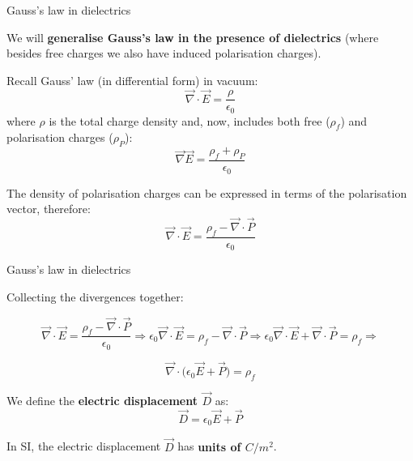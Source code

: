 %
%
%

\begin{frame}{Gauss's law in dielectrics}

We will {\bf generalise Gauss's law in the presence of dielectrics}
(where besides free charges we also have induced polarisation charges).\\

\vspace{0.2cm}

Recall Gauss' law (in differential form) in vacuum:
\begin{equation*}
   \vec{\nabla} \cdot \vec{E} = \frac{\rho}{\epsilon_0}
\end{equation*}
where $\rho$ is the total charge density and, now, includes both free ($\rho_f$) and polarisation charges ($\rho_P$):
\begin{equation*}
   \vec{\nabla} \vec{E} = \frac{\rho_f + \rho_P}{\epsilon_0}
\end{equation*}

The density of polarisation charges can be expressed in terms of the polarisation vector, therefore:
\begin{equation*}
   \vec{\nabla} \cdot \vec{E} = \frac{\rho_f - \vec{\nabla} \cdot \vec{P}}{\epsilon_0}
\end{equation*}

\end{frame}

%
%
%

\begin{frame}{Gauss's law in dielectrics}


Collecting the divergences together:

\begin{equation*}
   \vec{\nabla} \cdot \vec{E} = \frac{\rho_f - \vec{\nabla} \cdot \vec{P}}{\epsilon_0} \Rightarrow
   \epsilon_0 \vec{\nabla} \cdot \vec{E} = \rho_f - \vec{\nabla} \cdot \vec{P} \Rightarrow
   \epsilon_0 \vec{\nabla} \cdot \vec{E} + \vec{\nabla} \cdot \vec{P} = \rho_f \Rightarrow
\end{equation*}

\begin{equation*}
   \vec{\nabla} \cdot \Big( \epsilon_0 \vec{E} + \vec{P} \Big) = \rho_f
\end{equation*}

We define the {\bf electric displacement $\vec{D}$} as:
\begin{equation*}
   \vec{D} = \epsilon_0 \vec{E} + \vec{P}
\end{equation*}

In SI, the electric displacement $\vec{D}$ has {\bf units of $C/m^2$}.

\end{frame}

